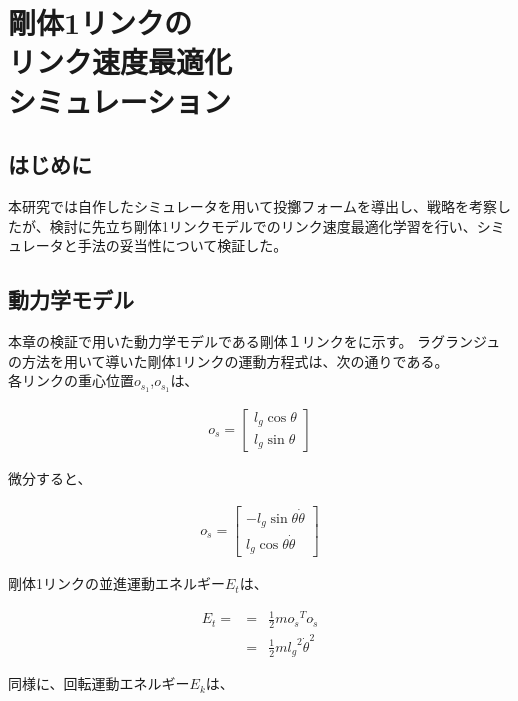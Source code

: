\chapter[剛体1リンクのリンク速度最適化シミュレーション]{剛体1リンクの\\リンク速度最適化\\シミュレーション}

\section{はじめに}
本研究では自作したシミュレータを用いて投擲フォームを導出し、戦略を考察したが、検討に先立ち剛体1リンクモデルでのリンク速度最適化学習を行い、シミュレータと手法の妥当性について検証した。
\section{動力学モデル}
本章の検証で用いた動力学モデルである剛体１リンクをに示す。
ラグランジュの方法を用いて導いた剛体1リンクの運動方程式は、次の通りである。\\
各リンクの重心位置$o_{s_{1}}$,$o_{s_{1}}$は、

\begin{eqnarray}
  o_{s} = 
              \begin{bmatrix}
              l_{g}\cos\theta\\
              l_{g}\sin\theta
              \end{bmatrix}
\end{eqnarray}

微分すると、

\begin{eqnarray}
  o_{\dot{s}} = 
              \begin{bmatrix}
              -l_{g}\sin\theta\dot{\theta}\\
              l_{g}\cos\theta\dot{\theta}
              \end{bmatrix}
\end{eqnarray}

剛体1リンクの並進運動エネルギー$E_{t}$は、

\begin{eqnarray}
  E_{t} =
  &=&\frac{1}{2}mo_{\dot{s}}{}^T\!o_{\dot{s}} \nonumber \\
  &=&\frac{1}{2}m{l_{g}}^2{\dot{\theta}}^2
\end{eqnarray}

同様に、回転運動エネルギー$E_{k}$は、

